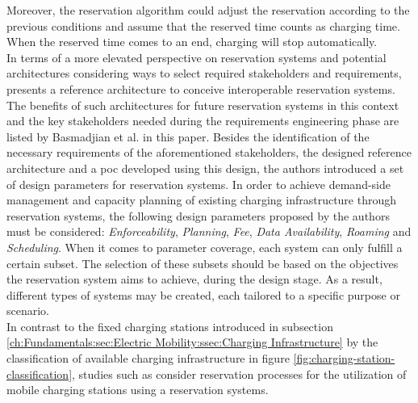 Moreover, the reservation algorithm could adjust the reservation according to the previous conditions and assume that the reserved time counts as charging time. When the reserved time comes to an end, charging will stop automatically. \\
\noindent In terms of a more elevated perspective on reservation systems and potential architectures considering ways to select required stakeholders and requirements, \cite{basmadjian_reference_2020} presents a reference architecture to conceive interoperable reservation systems.
The benefits of such architectures for future reservation systems in this context and the key stakeholders needed during the requirements engineering phase are listed by Basmadjian et al. in this paper.
Besides the identification of the necessary requirements of the aforementioned stakeholders, the designed reference architecture and a \acrshort{poc} developed using this design, the authors introduced a set of design parameters for reservation systems.
In order to achieve demand-side management and capacity planning of existing charging infrastructure through reservation systems, the following design parameters proposed by the authors must be considered: \textit{Enforceability}, \textit{Planning}, \textit{Fee}, \textit{Data Availability}, \textit{Roaming} and \textit{Scheduling}.
When it comes to parameter coverage, each system can only fulfill a certain subset. The selection of these subsets should be based on the objectives the reservation system aims to achieve, during the design stage.
As a result, different types of systems may be created, each tailored to a specific purpose or scenario. \\
\noindent In contrast to the fixed charging stations introduced in subsection \ref{ch:Fundamentals:sec:Electric Mobility:ssec:Charging Infrastructure} by the classification of available charging infrastructure in figure \ref{fig:charging-station-classification}, studies such as \cite{zhang_mobile_2020} consider reservation processes for the utilization of mobile charging stations using a reservation systems.
